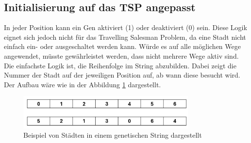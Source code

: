 \subsection{Initialisierung auf das TSP angepasst
\label{buch:paper:varalg:subsection:initialization_tsp}}
In jeder Position kann ein Gen aktiviert (1) oder deaktiviert (0) sein.
Diese Logik eignet sich jedoch nicht für das Travelling Salesman 
Problem, da eine Stadt nicht einfach ein- oder ausgeschaltet werden kann.
Würde es auf alle möglichen Wege angewendet, müsste gewährleistet werden, 
dass nicht mehrere Wege aktiv sind. Die einfachste Logik ist, die Reihenfolge  
im String abzubilden. Dabei zeigt die Nummer der Stadt auf der jeweiligen Position
auf, ab wann diese besucht wird. Der Aufbau wäre wie in der 
Abbildung \ref{fig:cities_genetic_string} dargestellt.
\begin{figure}
	\centering
	\includegraphics[width=0.8\textwidth]{
        papers/varalg/images/teil3/02GeneticStringCities.png
        }
	\caption{Beispiel von Städten in einem genetischen String dargestellt}
	\label{fig:cities_genetic_string}
\end{figure}
